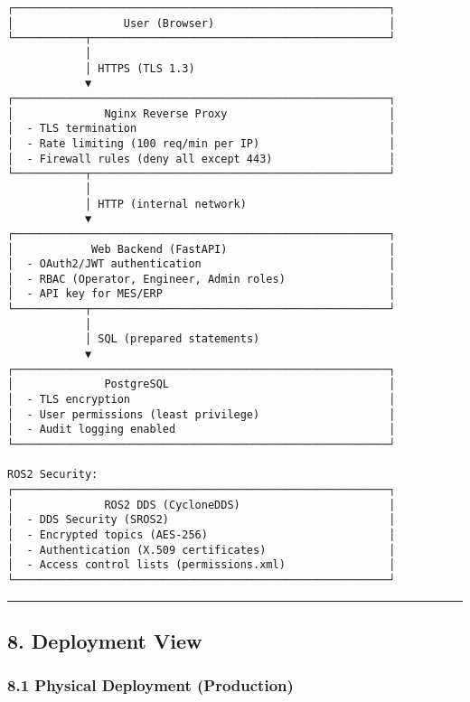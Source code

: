 \documentclass[
]{article}
\begin{document}
\begin{verbatim}
┌──────────────────────────────────────────────────────────┐
│                 User (Browser)                           │
└───────────┬──────────────────────────────────────────────┘
            │
            │ HTTPS (TLS 1.3)
            ▼
┌──────────────────────────────────────────────────────────┐
│              Nginx Reverse Proxy                         │
│  - TLS termination                                       │
│  - Rate limiting (100 req/min per IP)                    │
│  - Firewall rules (deny all except 443)                  │
└───────────┬──────────────────────────────────────────────┘
            │
            │ HTTP (internal network)
            ▼
┌──────────────────────────────────────────────────────────┐
│            Web Backend (FastAPI)                         │
│  - OAuth2/JWT authentication                             │
│  - RBAC (Operator, Engineer, Admin roles)                │
│  - API key for MES/ERP                                   │
└───────────┬──────────────────────────────────────────────┘
            │
            │ SQL (prepared statements)
            ▼
┌──────────────────────────────────────────────────────────┐
│              PostgreSQL                                  │
│  - TLS encryption                                        │
│  - User permissions (least privilege)                    │
│  - Audit logging enabled                                 │
└──────────────────────────────────────────────────────────┘

ROS2 Security:
┌──────────────────────────────────────────────────────────┐
│              ROS2 DDS (CycloneDDS)                       │
│  - DDS Security (SROS2)                                  │
│  - Encrypted topics (AES-256)                            │
│  - Authentication (X.509 certificates)                   │
│  - Access control lists (permissions.xml)                │
└──────────────────────────────────────────────────────────┘
\end{verbatim}

\begin{center}\rule{0.5\linewidth}{0.5pt}\end{center}

\hypertarget{deployment-view}{%
\subsection{8. Deployment View}\label{deployment-view}}

\hypertarget{physical-deployment-production}{%
\subsubsection{8.1 Physical Deployment
(Production)}\label{physical-deployment-production}}
\end{document}
